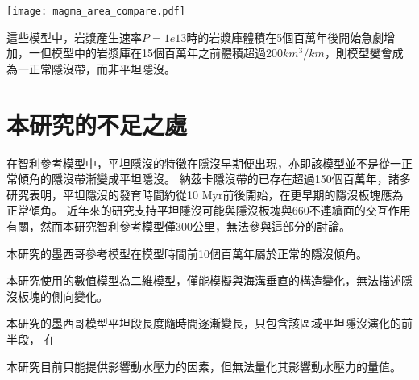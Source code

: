 \begin{figure*}[h]
    \centering
    \texttt{[image: magma\_area\_compare.pdf]}
    \caption[]{}
    \label{fig::magma_area_compare_Nazca}
\end{figure*}

這些模型中，岩漿產生速率$P=1e13$時的岩漿庫體積在5個百萬年後開始急劇增加，一但模型中的岩漿庫在15個百萬年之前體積超過200$km^3/km$，則模型變會成為一正常隱沒帶，而非平坦隱沒。

\section{本研究的不足之處}
在智利參考模型中，平坦隱沒的特徵在隱沒早期便出現，亦即該模型並不是從一正常傾角的隱沒帶漸變成平坦隱沒。
納茲卡隱沒帶的已存在超過150個百萬年，諸多研究表明，平坦隱沒的發育時間約從10 Myr前後開始，在更早期的隱沒板塊應為正常傾角。
近年來的研究支持平坦隱沒可能與隱沒板塊與660不連續面的交互作用有關，然而本研究智利參考模型僅300公里，無法參與這部分的討論。

本研究的墨西哥參考模型在模型時間前10個百萬年屬於正常的隱沒傾角。

本研究使用的數值模型為二維模型，僅能模擬與海溝垂直的構造變化，無法描述隱沒板塊的側向變化。

本研究的墨西哥模型平坦段長度隨時間逐漸變長，只包含該區域平坦隱沒演化的前半段，
在

本研究目前只能提供影響動水壓力的因素，但無法量化其影響動水壓力的量值。